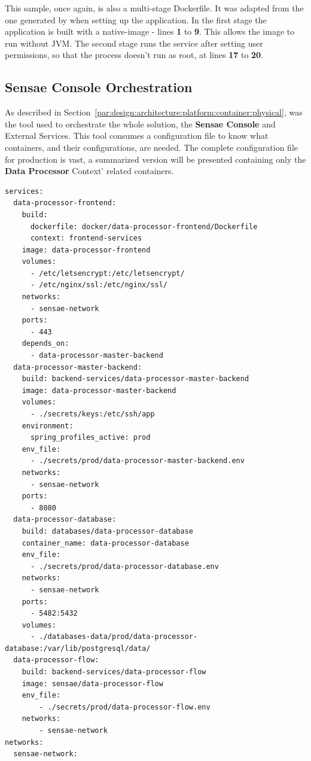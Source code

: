 This sample, once again, is also a multi-stage Dockerfile. It was adapted from the one generated by  when setting up the application. In the first stage the application is built with a  native-image - lines \textbf{1} to \textbf{9}. This allows the image to run without \gls{JVM}. The second stage runs the service after setting user permissions, so that the process doesn't run as root, at lines \textbf{17} to \textbf{20}.

\subsection{Sensae Console Orchestration}
\label{subsec:implementation:description:compose}

As described in Section~\ref{par:design:architecture:platform:container:physical},  was the tool used to orchestrate the whole solution, the \textbf{Sensae Console} and External Services. This tool consumes a configuration file to know what containers, and their configurations, are needed. The complete configuration file for production is vast, a summarized version will be presented containing only the \textbf{Data Processor} Context' related containers.

\begin{lstlisting}[style=yaml, caption=Docker Compose Configuration File for Production, label={code:implementation:description:compose:file}]
services:
  data-processor-frontend:
    build:
      dockerfile: docker/data-processor-frontend/Dockerfile
      context: frontend-services
    image: data-processor-frontend
    volumes:
      - /etc/letsencrypt:/etc/letsencrypt/
      - /etc/nginx/ssl:/etc/nginx/ssl/
    networks:
      - sensae-network
    ports:
      - 443
    depends_on:
      - data-processor-master-backend
  data-processor-master-backend:
    build: backend-services/data-processor-master-backend
    image: data-processor-master-backend
    volumes:
      - ./secrets/keys:/etc/ssh/app
    environment:
      spring_profiles_active: prod
    env_file:
      - ./secrets/prod/data-processor-master-backend.env
    networks:
      - sensae-network
    ports:
      - 8080
  data-processor-database:
    build: databases/data-processor-database
    container_name: data-processor-database
    env_file:
      - ./secrets/prod/data-processor-database.env
    networks:
      - sensae-network
    ports:
      - 5482:5432
    volumes:
      - ./databases-data/prod/data-processor-database:/var/lib/postgresql/data/
  data-processor-flow:
    build: backend-services/data-processor-flow
    image: sensae/data-processor-flow
    env_file:
        - ./secrets/prod/data-processor-flow.env
    networks:
        - sensae-network
networks:
  sensae-network:
\end{lstlisting}

